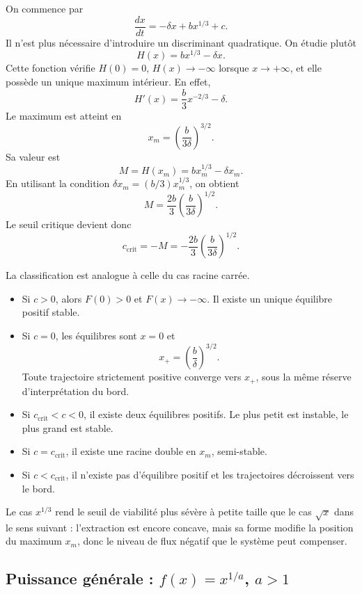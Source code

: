 \documentclass[11pt,a4paper]{article}
\begin{document}
On commence par
\[
    \frac{dx}{dt}=-\delta x+b x^{1/3}+c.
\]
Il n'est plus nécessaire d'introduire un discriminant quadratique. On étudie plutôt
\[
    H(x)=b x^{1/3}-\delta x.
\]
Cette fonction vérifie \(H(0)=0\), \(H(x)\to -\infty\) lorsque \(x\to+\infty\), et elle possède un unique maximum intérieur. En effet,
\[
    H'(x)=\frac{b}{3}x^{-2/3}-\delta.
\]
Le maximum est atteint en
\[
    x_m=\left(\frac{b}{3\delta}\right)^{3/2}.
\]
Sa valeur est
\[
    M=H(x_m)
    =
    b x_m^{1/3}-\delta x_m.
\]
En utilisant la condition \( \delta x_m=(b/3)x_m^{1/3}\), on obtient
\begin{equation}
    M=\frac{2b}{3}
    \left(\frac{b}{3\delta}\right)^{1/2}.
    \label{eq:cubic_M}
\end{equation}
Le seuil critique devient donc
\[
    c_{\mathrm{crit}}=-M
    =
    -\frac{2b}{3}
    \left(\frac{b}{3\delta}\right)^{1/2}.
\]

La classification est analogue à celle du cas racine carrée.
\begin{itemize}
    \item Si \(c>0\), alors \(F(0)>0\) et \(F(x)\to-\infty\). Il existe un unique équilibre positif stable.
    \item Si \(c=0\), les équilibres sont \(x=0\) et
    \[
        x_+=\left(\frac{b}{\delta}\right)^{3/2}.
    \]
    Toute trajectoire strictement positive converge vers \(x_+\), sous la même réserve d'interprétation du bord.
    \item Si \(c_{\mathrm{crit}}<c<0\), il existe deux équilibres positifs. Le plus petit est instable, le plus grand est stable.
    \item Si \(c=c_{\mathrm{crit}}\), il existe une racine double en \(x_m\), semi-stable.
    \item Si \(c<c_{\mathrm{crit}}\), il n'existe pas d'équilibre positif et les trajectoires décroissent vers le bord.
\end{itemize}

Le cas \(x^{1/3}\) rend le seuil de viabilité plus sévère à petite taille que le cas \(\sqrt{x}\) dans le sens suivant : l'extraction est encore concave, mais sa forme modifie la position du maximum \(x_m\), donc le niveau de flux négatif que le système peut compenser.

\subsection{Puissance générale : \(f(x)=x^{1/a}\), \(a>1\)}
\end{document}
